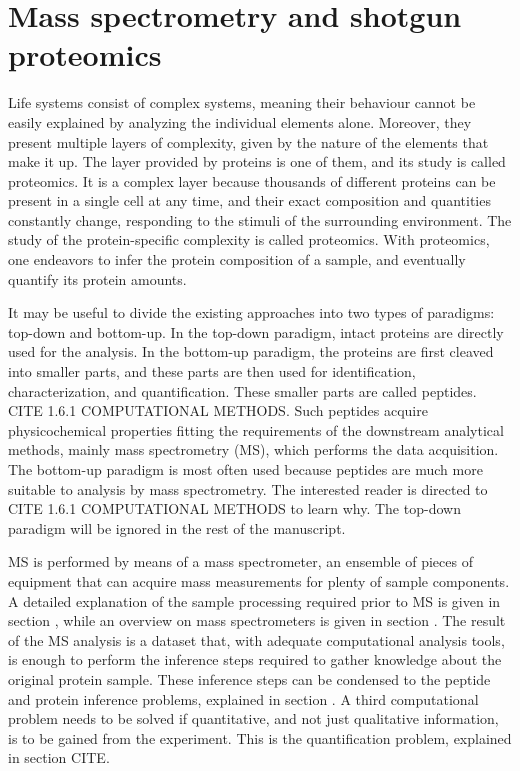 \documentclass[11pt, a4paper]{report}
\begin{document}
\chapter{Mass spectrometry and shotgun proteomics}
\label{chap:mass_spec}

Life systems consist of complex systems, meaning their behaviour cannot be easily explained by analyzing the individual elements alone. Moreover, they present multiple layers of complexity, given by the nature of the elements that make it up. The layer provided by proteins is one of them, and its study is called proteomics. It is a complex layer because thousands of different proteins can be present in a single cell at any time, and their exact composition and quantities constantly change, responding to the stimuli of the surrounding environment. The study of the protein-specific complexity is called proteomics. With proteomics, one endeavors to infer the protein composition of a sample, and eventually quantify its protein amounts.

It may be useful to divide the existing approaches into two types of paradigms: top-down and bottom-up. In the top-down paradigm, intact proteins are directly used for the analysis. In the bottom-up paradigm, the proteins are first cleaved into smaller parts, and these parts are then used for identification, characterization, and quantification. These smaller parts are called peptides. CITE 1.6.1 COMPUTATIONAL METHODS. Such peptides acquire physicochemical properties fitting the requirements of the downstream analytical methods, mainly mass spectrometry (MS), which performs the data acquisition. The bottom-up paradigm is most often used because peptides are much more suitable to analysis by mass spectrometry. The interested reader is directed to CITE 1.6.1 COMPUTATIONAL METHODS to learn why. The top-down paradigm will be ignored in the rest of the manuscript.

MS is performed by means of a mass spectrometer, an ensemble of pieces of equipment that can acquire mass measurements for plenty of sample components. A detailed explanation of the sample processing required prior to MS is given in section \label{sec:sample processing}, while an overview on mass spectrometers is given in section \label{sec:the mass spectrometer}. The result of the MS analysis is a dataset that, with adequate computational analysis tools, is enough to perform the inference steps required to gather knowledge about the original protein sample. These inference steps can be condensed to the peptide and protein inference problems, explained in section \label{sec:peptide and protein inference}. A third computational problem needs to be solved if quantitative, and not just qualitative information, is to be gained from the experiment. This is the quantification problem, explained in section \label{sec:quantification} CITE.
\end{document}
